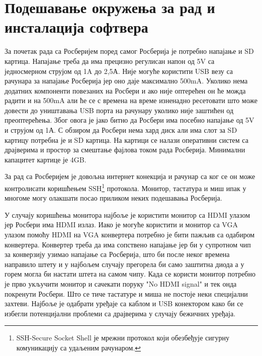 \documentclass[12pt,oneside]{memoir}
\theoremstyle{remark}
\begin{document}
\section{Подешавање окружења за рад и инсталација софтвера}
За почетак рада са Росберијем поред самог Росберија је потребно напајање и SD картица. Напајање треба да има прецизно регулисан напон од 5V са једносмерном струјом од 1A до 2,5А. Није могуће користити USB везу са рачунара за напајање Росберија јер оно даје максимално 500mA. Уколико нема додатних компоненти повезаних на Росбери и ако није оптерећен он ће можда радити и на 500mA али ће се с времена на време изненадно ресетовати што може довести до уништавања USB порта на рачунару уколико није заштићен од преоптерећења. Због овога је јако битно да Росбери има посебно напајање од 5V и струјом од 1А. С обзиром да Росбери нема хард диск али има слот за SD картицу потребна је и SD картица. На картици се налази оперативни систем са драјверима и простор за смештање фајлова током рада Росберија. Минимални капацитет картице је 4GB.

За рад са Росберијем је довољна интернет конекција и рачунар са ког се он може контролисати коришћењем SSH\footnote{SSH-Secure Socket Shell је мрежни протокол који обезбеђује сигурну комуникацију са удаљеним рачунаром.} протокола. Монитор, тастатура и миш ипак у многоме могу олакшати посао приликом неких подешавања Росберија.

У случају коришћења монитора најбоље је користити монитор са HDMI улазом јер Росбери има HDMI излаз. Иако је могуће користити и монитор са VGA улазом помоћу HDMI на VGA конвертера потребно је бити пажљив са одабиром конвертера. Конвертер треба да има сопствено напајање јер би у супротном чип за конверзију узимао напајање са Росберија, што би после неког времена направило штету и у најбољем случају прегорела би само заштитна диода а у горем могла би настати штета на самом чипу. Када се користи монитор потребно је прво укључити монитор и сачекати поруку "No HDMI signal" и тек онда покренути Росбери. Што се тиче тастатуре и миша не постоје неки специјални захтеви. Најбоље је одабрати уређаје са каблом и USB конектором како би се избегли потенцијални проблеми са драјверима у случају бежичних уређаја. 
\end{document}

